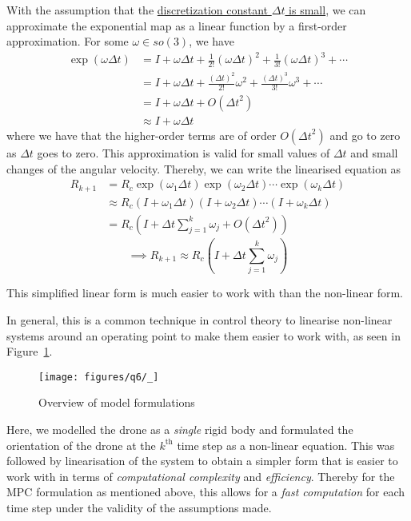With the assumption that the \underline{discretization constant \( \Delta t \) is small}, we can approximate the exponential map as a linear function by a first-order approximation.
For some \( \omega \in so(3)\), we have
\begin{align*}
    \exp(\omega \Delta t)
     & =
    I + \omega \Delta t + \frac{1}{2!} {(\omega \Delta t)}^2 + \frac{1}{3!} {(\omega \Delta t)}^3 + \cdots
    \\ & =
    I + \omega \Delta t + \frac{{(\Delta t)}^2}{2!} \omega^2 + \frac{{(\Delta t)}^3}{3!} \omega^3 + \cdots
    \\ & =
    I + \omega \Delta t + O({\Delta t}^2)
    \\
     & \approx
    I + \omega \Delta t
\end{align*}
where we have that the higher-order terms are of order \( O({\Delta t}^2) \) and go to zero as \( \Delta t \) goes to zero.
This approximation is valid for small values of \( \Delta t \) and small changes of the angular velocity.
Thereby, we can write the linearised equation as
\begin{align*}
    R_{k+1}
     & =
    R_c \exp(\omega_1 \Delta t) \exp(\omega_2 \Delta t) \cdots \exp(\omega_k \Delta t)
    \\ & \approx
    R_c (I + \omega_1 \Delta t) (I + \omega_2 \Delta t) \cdots (I + \omega_k \Delta t)
    \\ & =
    R_c \left( I + \Delta t \sum_{j=1}^{k} \omega_j + O({\Delta t}^2) \right)
\end{align*}
\begin{equation*}
    \implies
    \boxed{
        R_{k+1}
        \approx
        R_c \left( I + \Delta t \sum_{j=1}^{k} \omega_j \right)
    }
\end{equation*}

This simplified linear form is much easier to work with than the non-linear form.

In general, this is a common technique in control theory to linearise non-linear systems around an operating point to make them easier to work with, as seen in Figure~\ref{fig:q6-flowchart}.

\begin{figure}[htbp]
    \centering
    \texttt{[image: figures/q6/\_]}
    \caption{
        Overview of model formulations
    }\label{fig:q6-flowchart}
\end{figure}

Here, we modelled the drone as a \textit{single} rigid body and formulated the orientation of the drone at the \( k^{\text{th}} \) time step as a non-linear equation.
This was followed by linearisation of the system to obtain a simpler form that is easier to work with in terms of \textit{computational complexity} and \textit{efficiency}.
Thereby for the MPC formulation as mentioned above, this allows for a \textit{fast computation} for each time step under the validity of the assumptions made.

